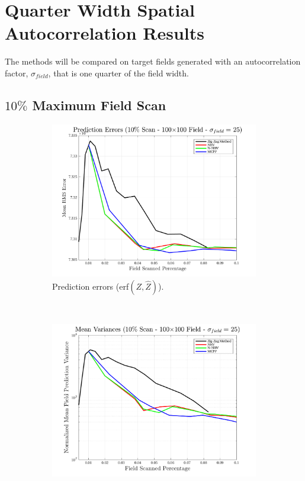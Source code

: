 \section{Quarter Width Spatial Autocorrelation Results}
The methods will be compared on target fields generated with an autocorrelation factor, $\sigma_{field}$, that is one quarter of the field width.

\clearpage
\subsection{$10\%$ Maximum Field Scan}
\begin{figure}[htb!]
    \centering
    \begin{subfigure}[t]{0.65\textwidth}
        \centering
        \includegraphics[width=\linewidth]{figures/hbresults/pred_errs_10p_100x100_sf_25_seed_3.png}
        \captionsetup{skip=0.20\baselineskip,size=footnotesize}
        \caption{Prediction errors (erf$(Z,\hat{Z})$).}
        \label{fig:prederrs_sigma25_p10_s3}
    \end{subfigure}%
    \\
    \begin{subfigure}[t]{0.65\textwidth}
        \centering
        \includegraphics[width=\linewidth]{figures/hbresults/vars_10p_100x100_sf_25_seed_3.png}

\end{subfigure}
\end{figure}
